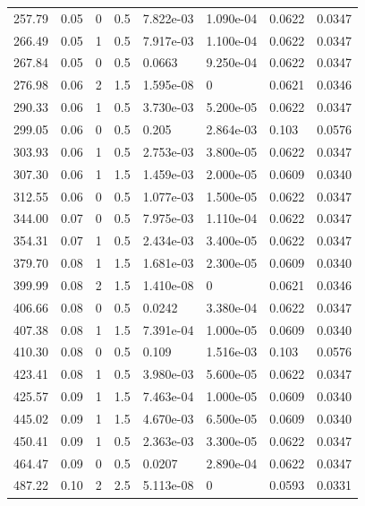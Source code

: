 \documentclass[preview]{standalone}
\begin{document}
{{\begin{tabular}{L{1.2cm}C{1.2cm} C{0.3cm}C{0.5cm} C{1.4cm}C{1.4cm} C{1.4cm}C{1.4cm}}
  257.79  &  0.05  & 0     & 0.5 &  7.822e-03  & 1.090e-04  & 0.0622 &  0.0347   \\ 
  266.49  &  0.05  & 1     & 0.5 &  7.917e-03  & 1.100e-04  & 0.0622 &  0.0347   \\ 
  267.84  &  0.05  & 0     & 0.5 &  0.0663  & 9.250e-04  & 0.0622 &  0.0347   \\ 
  276.98  &  0.06  & 2     & 1.5 &  1.595e-08  & 0  & 0.0621 &  0.0346   \\ 
  290.33  &  0.06  & 1     & 0.5 &  3.730e-03  & 5.200e-05  & 0.0622 &  0.0347   \\ 
  299.05  &  0.06  & 0     & 0.5 &  0.205  & 2.864e-03  & 0.103 &  0.0576   \\ 
  303.93  &  0.06  & 1     & 0.5 &  2.753e-03  & 3.800e-05  & 0.0622 &  0.0347   \\ 
  307.30  &  0.06  & 1     & 1.5 &  1.459e-03  & 2.000e-05  & 0.0609 &  0.0340   \\ 
  312.55  &  0.06  & 0     & 0.5 &  1.077e-03  & 1.500e-05  & 0.0622 &  0.0347   \\ 
  344.00  &  0.07  & 0     & 0.5 &  7.975e-03  & 1.110e-04  & 0.0622 &  0.0347   \\ 
  354.31  &  0.07  & 1     & 0.5 &  2.434e-03  & 3.400e-05  & 0.0622 &  0.0347   \\ 
  379.70  &  0.08  & 1     & 1.5 &  1.681e-03  & 2.300e-05  & 0.0609 &  0.0340   \\ 
  399.99  &  0.08  & 2     & 1.5 &  1.410e-08  & 0  & 0.0621 &  0.0346   \\ 
  406.66  &  0.08  & 0     & 0.5 &  0.0242  & 3.380e-04  & 0.0622 &  0.0347   \\ 
  407.38  &  0.08  & 1     & 1.5 &  7.391e-04  & 1.000e-05  & 0.0609 &  0.0340   \\ 
  410.30  &  0.08  & 0     & 0.5 &  0.109  & 1.516e-03  & 0.103 &  0.0576   \\ 
  423.41  &  0.08  & 1     & 0.5 &  3.980e-03  & 5.600e-05  & 0.0622 &  0.0347   \\ 
  425.57  &  0.09  & 1     & 1.5 &  7.463e-04  & 1.000e-05  & 0.0609 &  0.0340   \\ 
  445.02  &  0.09  & 1     & 1.5 &  4.670e-03  & 6.500e-05  & 0.0609 &  0.0340   \\ 
  450.41  &  0.09  & 1     & 0.5 &  2.363e-03  & 3.300e-05  & 0.0622 &  0.0347   \\ 
  464.47  &  0.09  & 0     & 0.5 &  0.0207  & 2.890e-04  & 0.0622 &  0.0347   \\ 
  487.22  &  0.10  & 2     & 2.5 &  5.113e-08  & 0  & 0.0593 &  0.0331   \\ 

\end{tabular}}}
\end{document}
